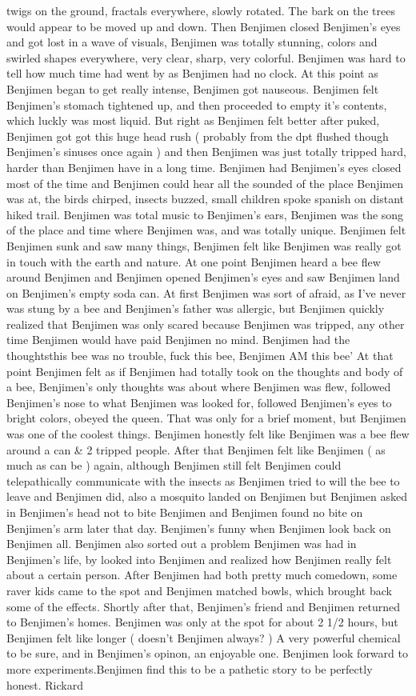 \documentclass[12pt]{book}
\begin{document}
twigs on the ground, fractals everywhere, slowly rotated. The bark on the trees would appear to be moved up and down. Then Benjimen closed Benjimen's eyes and got lost in a wave of visuals, Benjimen was totally stunning, colors and swirled shapes everywhere, very clear, sharp, very colorful. Benjimen was hard to tell how much time had went by as Benjimen had no clock. At this point as Benjimen began to get really intense, Benjimen got nauseous. Benjimen felt Benjimen's stomach tightened up, and then proceeded to empty it's contents, which luckly was most liquid. But right as Benjimen felt better after puked, Benjimen got got this huge head rush ( probably from the dpt flushed though Benjimen's sinuses once again ) and then Benjimen was just totally tripped hard, harder than Benjimen have in a long time. Benjimen had Benjimen's eyes closed most of the time and Benjimen could hear all the sounded of the place Benjimen was at, the birds chirped, insects buzzed, small children spoke spanish on distant hiked trail. Benjimen was total music to Benjimen's ears, Benjimen was the song of the place and time where Benjimen was, and was totally unique. Benjimen felt Benjimen sunk and saw many things, Benjimen felt like Benjimen was really got in touch with the earth and nature. At one point Benjimen heard a bee flew around Benjimen and Benjimen opened Benjimen's eyes and saw Benjimen land on Benjimen's empty soda can. At first Benjimen was sort of afraid, as I've never was stung by a bee and Benjimen's father was allergic, but Benjimen quickly realized that Benjimen was only scared because Benjimen was tripped, any other time Benjimen would have paid Benjimen no mind. Benjimen had the thoughtsthis bee was no trouble, fuck this bee, Benjimen AM this bee' At that point Benjimen felt as if Benjimen had totally took on the thoughts and body of a bee, Benjimen's only thoughts was about where Benjimen was flew, followed Benjimen's nose to what Benjimen was looked for, followed Benjimen's eyes to bright colors, obeyed the queen. That was only for a brief moment, but Benjimen was one of the coolest things. Benjimen honestly felt like Benjimen was a bee flew around a can \& 2 tripped people. After that Benjimen felt like Benjimen ( as much as can be ) again, although Benjimen still felt Benjimen could telepathically communicate with the insects as Benjimen tried to will the bee to leave and Benjimen did, also a mosquito landed on Benjimen but Benjimen asked in Benjimen's head not to bite Benjimen and Benjimen found no bite on Benjimen's arm later that day. Benjimen's funny when Benjimen look back on Benjimen all. Benjimen also sorted out a problem Benjimen was had in Benjimen's life, by looked into Benjimen and realized how Benjimen really felt about a certain person. After Benjimen had both pretty much comedown, some raver kids came to the spot and Benjimen matched bowls, which brought back some of the effects. Shortly after that, Benjimen's friend and Benjimen returned to Benjimen's homes. Benjimen was only at the spot for about 2 1/2 hours, but Benjimen felt like longer ( doesn't Benjimen always? ) A very powerful chemical to be sure, and in Benjimen's opinon, an enjoyable one. Benjimen look forward to more experiments.Benjimen find this to be a pathetic story to be perfectly honest. Rickard 
\end{document}
